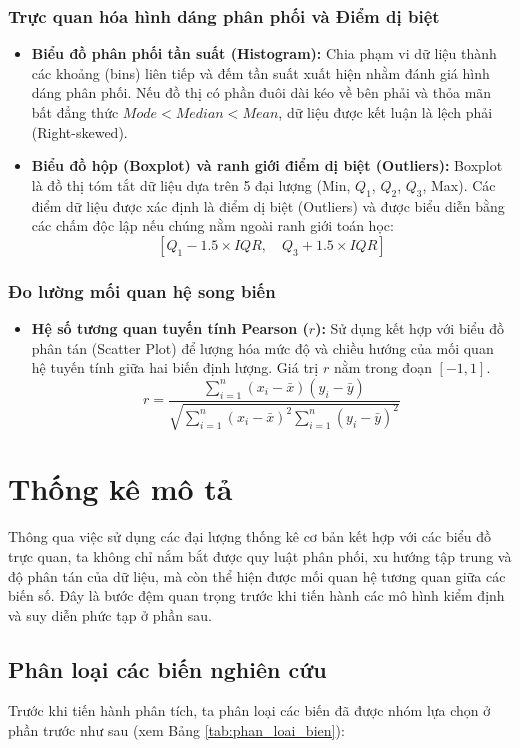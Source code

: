 \documentclass[12pt, a4paper]{article}
\begin{document}
\subsubsection{Trực quan hóa hình dáng phân phối và Điểm dị biệt}
\begin{itemize}
    \item \textbf{Biểu đồ phân phối tần suất (Histogram):} Chia phạm vi dữ liệu thành các khoảng (bins) liên tiếp và đếm tần suất xuất hiện nhằm đánh giá hình dáng phân phối. Nếu đồ thị có phần đuôi dài kéo về bên phải và thỏa mãn bất đẳng thức $Mode < Median < Mean$, dữ liệu được kết luận là lệch phải (Right-skewed).
    \item \textbf{Biểu đồ hộp (Boxplot) và ranh giới điểm dị biệt (Outliers):} Boxplot là đồ thị tóm tắt dữ liệu dựa trên 5 đại lượng (Min, $Q_1$, $Q_2$, $Q_3$, Max). Các điểm dữ liệu được xác định là điểm dị biệt (Outliers) và được biểu diễn bằng các chấm độc lập nếu chúng nằm ngoài ranh giới toán học:
    $$ [Q_1 - 1.5 \times IQR, \quad Q_3 + 1.5 \times IQR] $$
\end{itemize}

\subsubsection{Đo lường mối quan hệ song biến}
\begin{itemize}
    \item \textbf{Hệ số tương quan tuyến tính Pearson ($r$):} Sử dụng kết hợp với biểu đồ phân tán (Scatter Plot) để lượng hóa mức độ và chiều hướng của mối quan hệ tuyến tính giữa hai biến định lượng. Giá trị $r$ nằm trong đoạn $[-1, 1]$.
    $$ r = \frac{\sum_{i=1}^{n} (x_i - \bar{x})(y_i - \bar{y})}{\sqrt{\sum_{i=1}^{n} (x_i - \bar{x})^2 \sum_{i=1}^{n} (y_i - \bar{y})^2}} $$
\end{itemize}

\section{Thống kê mô tả} 
Thông qua việc sử dụng các đại lượng thống kê cơ bản kết hợp với các biểu đồ trực quan, ta không chỉ nắm bắt được quy luật phân phối, xu hướng tập 
trung và độ phân tán của dữ liệu, mà còn thể hiện được mối quan hệ tương quan giữa các biến số. Đây là bước đệm quan trọng trước khi tiến hành các 
mô hình kiểm định và suy diễn phức tạp ở phần sau.

\subsection{Phân loại các biến nghiên cứu}
Trước khi tiến hành phân tích, ta phân loại các biến đã được nhóm lựa chọn ở phần trước như sau (xem Bảng \ref{tab:phan_loai_bien}):
\end{document}

